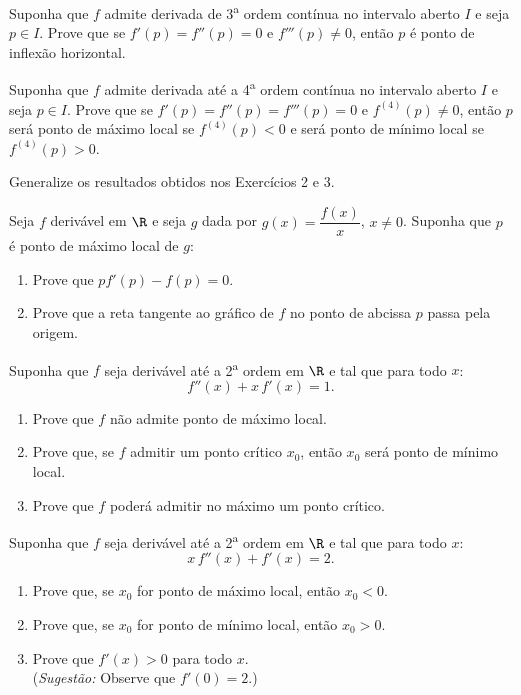 \begin{exercicio}[2]
Suponha que $f$ admite derivada de 3\textsuperscript{a} ordem contínua no intervalo aberto $I$ e seja $p \in I$. Prove que se $f'(p) = f''(p) = 0$ e $f'''(p) \neq 0$, então $p$ é ponto de inflexão horizontal.
\end{exercicio}

\begin{exercicio}[3]
Suponha que $f$ admite derivada até a 4\textsuperscript{a} ordem contínua no intervalo aberto $I$ e seja $p \in I$. Prove que se $f'(p) = f''(p) = f'''(p) = 0$ e $f^{(4)}(p) \neq 0$, então $p$ será ponto de máximo local se $f^{(4)}(p) < 0$ e será ponto de mínimo local se $f^{(4)}(p) > 0$.
\end{exercicio}

\begin{exercicio}[4]
Generalize os resultados obtidos nos Exercícios 2 e 3.
\end{exercicio}

\begin{exercicio}[5]
Seja $f$ derivável em $\R$ e seja $g$ dada por $g(x) = \dfrac{f(x)}{x}$, $x \neq 0$. Suponha que $p$ é ponto de máximo local de $g$:
\begin{enumerate}[label=\alph*)]
    \item Prove que $pf'(p) - f(p) = 0$.
    \item Prove que a reta tangente ao gráfico de $f$ no ponto de abcissa $p$ passa pela origem.
\end{enumerate}
\end{exercicio}

\begin{exercicio}[6]
Suponha que $f$ seja derivável até a 2\textsuperscript{a} ordem em $\R$ e tal que para todo $x$:
\[
f''(x) + x\,f'(x) = 1.
\]
\begin{enumerate}[label=\alph*)]
    \item Prove que $f$ não admite ponto de máximo local.
    \item Prove que, se $f$ admitir um ponto crítico $x_0$, então $x_0$ será ponto de mínimo local.
    \item Prove que $f$ poderá admitir no máximo um ponto crítico.
\end{enumerate}
\end{exercicio}

\begin{exercicio}[7]
Suponha que $f$ seja derivável até a 2\textsuperscript{a} ordem em $\R$ e tal que para todo $x$:
\[
x\,f''(x) + f'(x) = 2.
\]
\begin{enumerate}[label=\alph*)]
    \item Prove que, se $x_0$ for ponto de máximo local, então $x_0 < 0$.
    \item Prove que, se $x_0$ for ponto de mínimo local, então $x_0 > 0$.
    \item Prove que $f'(x) > 0$ para todo $x$.\\
    (\textit{Sugestão:} Observe que $f'(0) = 2$.)
\end{enumerate}
\end{exercicio}

